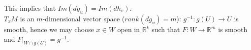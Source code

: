 \begin{remark}
\begin{center}
\begin{minipage}{0.48\textwidth}
    \end{minipage}
    \hfill
    \begin{minipage}{0.48\textwidth}
    \centering
    \end{minipage}
    \end{center}
    This implies that $Im(dg_u)=Im(dh_v)$.\\
    $T_xM$ is an $m$-dimensional vector space ($rank(dg_u)=m$):
    $g^{-1}:g(U)\to U$ is smooth, hence we may choose $x\in W$ open in $\mathbb{R}^k$ such that $F:W\to \mathbb{R}^m$ is smooth and $F|_{W\cap g(U)}=g^{-1}$.\\
    \begin{center}
\begin{minipage}{0.48\textwidth}
\centering
{}
\end{minipage}
\hfill
\begin{minipage}{0.48\textwidth}
\centering
{}
\end{minipage}
    \end{center}
\end{remark}
